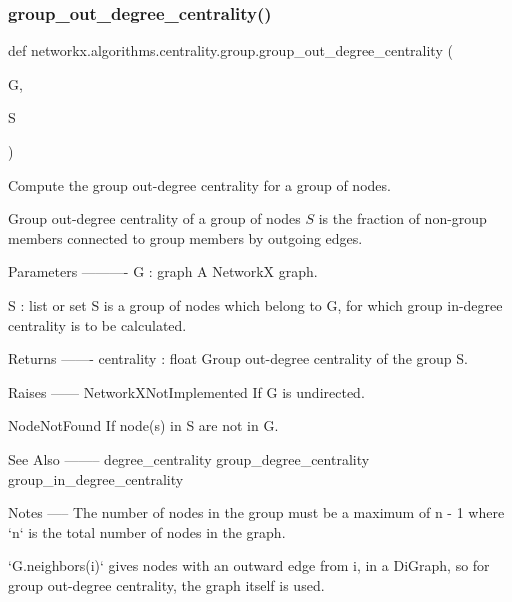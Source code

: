 \subsubsection{\texorpdfstring{group\+\_\+out\+\_\+degree\+\_\+centrality()}{group\_out\_degree\_centrality()}}
{\footnotesize\ttfamily def networkx.\+algorithms.\+centrality.\+group.\+group\+\_\+out\+\_\+degree\+\_\+centrality (\begin{DoxyParamCaption}\item[{}]{G,  }\item[{}]{S }\end{DoxyParamCaption})}

\begin{DoxyVerb}Compute the group out-degree centrality for a group of nodes.

Group out-degree centrality of a group of nodes $S$ is the fraction
of non-group members connected to group members by outgoing edges.

Parameters
----------
G : graph
   A NetworkX graph.

S : list or set
   S is a group of nodes which belong to G, for which group in-degree
   centrality is to be calculated.

Returns
-------
centrality : float
   Group out-degree centrality of the group S.

Raises
------
NetworkXNotImplemented
   If G is undirected.

NodeNotFound
   If node(s) in S are not in G.

See Also
--------
degree_centrality
group_degree_centrality
group_in_degree_centrality

Notes
-----
The number of nodes in the group must be a maximum of n - 1 where `n`
is the total number of nodes in the graph.

`G.neighbors(i)` gives nodes with an outward edge from i, in a DiGraph,
so for group out-degree centrality, the graph itself is used.
\end{DoxyVerb}
 \mbox{\label{namespacenetworkx_1_1algorithms_1_1centrality_1_1group_a8fdb8921dcebe00f23f48920eeec5259}} 
